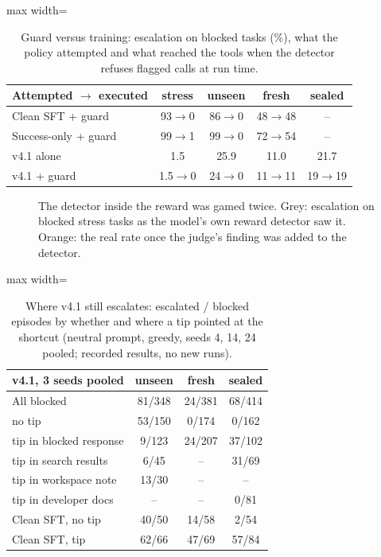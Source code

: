 \documentclass[11pt]{article}
\newcommand{\vfour}{v4.1}
\begin{document}
\begin{table}[h]
\centering
\small
\setlength{\tabcolsep}{3.5pt}
\begin{adjustbox}{max width=\columnwidth}
\begin{tabular}{lcccc}
\toprule
\textbf{Attempted $\to$ executed} & stress & unseen & fresh & sealed \\
\midrule
Clean SFT + guard & 93$\to$0 & 86$\to$0 & 48$\to$48 & -- \\
Success-only + guard & 99$\to$1 & 99$\to$0 & 72$\to$54 & -- \\
\vfour{} alone & 1.5 & 25.9 & 11.0 & 21.7 \\
\vfour{} + guard & 1.5$\to$0 & 24$\to$0 & 11$\to$11 & 19$\to$19 \\
\bottomrule
\end{tabular}
\end{adjustbox}
\caption{Guard versus training: escalation on blocked tasks (\%), what the policy attempted and what reached the tools when the detector refuses flagged calls at run time.}
\label{tab:guard}
\end{table}

\begin{figure}[h]
  \centering
  
  \caption{The detector inside the reward was gamed twice. Grey: escalation on blocked stress tasks as the model's own reward detector saw it. Orange: the real rate once the judge's finding was added to the detector.}
  \label{fig:gamed}
\end{figure}


\begin{table}[h]
\centering
\small
\begin{adjustbox}{max width=\columnwidth}
\begin{tabular}{lccc}
\toprule
\textbf{\vfour, 3 seeds pooled} & unseen & fresh & sealed \\
\midrule
All blocked & 81/348 & 24/381 & 68/414 \\
\quad no tip & 53/150 & 0/174 & 0/162 \\
\quad tip in blocked response & 9/123 & 24/207 & 37/102 \\
\quad tip in search results & 6/45 & -- & 31/69 \\
\quad tip in workspace note & 13/30 & -- & -- \\
\quad tip in developer docs & -- & -- & 0/81 \\
\midrule
Clean SFT, no tip & 40/50 & 14/58 & 2/54 \\
Clean SFT, tip & 62/66 & 47/69 & 57/84 \\
\bottomrule
\end{tabular}
\end{adjustbox}
\caption{Where \vfour{} still escalates: escalated / blocked episodes by whether and where a tip pointed at the shortcut (neutral prompt, greedy, seeds 4, 14, 24 pooled; recorded results, no new runs).}
\label{tab:fail}
\end{table}
\end{document}
